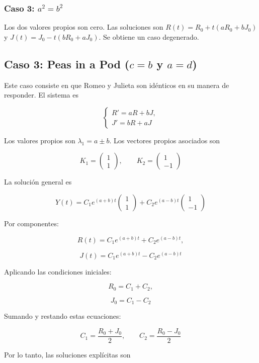 \documentclass[10pt]{article}
\numberwithin{equation}{section}
\begin{document}
\subsubsection{Caso 3: $a^2=b^2$}

Los dos valores propios son cero. Las soluciones son $R(t)=R_0+t(aR_0+bJ_0)$ y $J(t)=J_0-t(bR_0+aJ_0)$.
Se obtiene un caso degenerado.

\subsection{Caso 3: Peas in a Pod ($c = b$ y $a = d$)}

Este caso consiste en que Romeo y Julieta son idénticos en su manera de responder. El sistema es

\[
\boxed{
\begin{cases}
R'=aR+bJ,\\
J'=bR+aJ
\end{cases}
}
\]

Los valores propios son $\lambda_1=a \pm b$. Los vectores propios asociados son

\[
K_1=
\begin{pmatrix}
1\\
1
\end{pmatrix},
\qquad
K_2=
\begin{pmatrix}
1\\
-1
\end{pmatrix}
\]

La solución general es

\[
Y(t)=
C_1e^{(a+b)t}
\begin{pmatrix}
1\\
1
\end{pmatrix}
+
C_2e^{(a-b)t}
\begin{pmatrix}
1\\
-1
\end{pmatrix}
\]

Por componentes:

\[
R(t)=C_1e^{(a+b)t}
+C_2e^{(a-b)t},
\]

\[
J(t)=C_1e^{(a+b)t}
-C_2e^{(a-b)t}
\]

Aplicando las condiciones iniciales:

\[
R_0=C_1+C_2,
\]

\[
J_0=C_1-C_2
\]

Sumando y restando estas ecuaciones:

\[
C_1=\frac{R_0+J_0}{2},
\qquad
C_2=\frac{R_0-J_0}{2}
\]

Por lo tanto, las soluciones explícitas son
\end{document}
